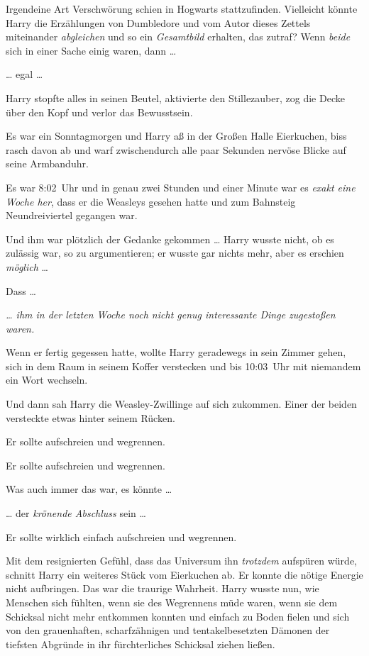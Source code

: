Irgendeine Art Verschwörung schien in Hogwarts stattzufinden. Vielleicht könnte Harry die Erzählungen von Dumbledore und vom Autor dieses Zettels miteinander \emph{abgleichen} und so ein \emph{Gesamtbild} erhalten, das zutraf? Wenn \emph{beide} sich in einer Sache einig waren, dann … 

… egal … 

Harry stopfte alles in seinen Beutel, aktivierte den Stillezauber, zog die Decke über den Kopf und verlor das Bewusstsein. 

\later 

Es war ein Sonntagmorgen und Harry aß in der Großen Halle Eierkuchen, biss rasch davon ab und warf zwischendurch alle paar Sekunden nervöse Blicke auf seine Armbanduhr. 

Es war 8:02~Uhr und in genau zwei Stunden und einer Minute war es \emph{exakt eine Woche her}, dass er die Weasleys gesehen hatte und zum Bahnsteig Neundreiviertel gegangen war. 

Und ihm war plötzlich der Gedanke gekommen … Harry wusste nicht, ob es zulässig war, so zu argumentieren; er wusste gar nichts mehr, aber es erschien \emph{möglich} … 

Dass … 

\emph{… ihm in der letzten Woche noch nicht genug interessante Dinge zugestoßen waren.} 

Wenn er fertig gegessen hatte, wollte Harry geradewegs in sein Zimmer gehen, sich in dem Raum in seinem Koffer verstecken und bis 10:03~Uhr mit niemandem ein Wort wechseln. 

Und dann sah Harry die Weasley-Zwillinge auf sich zukommen. Einer der beiden versteckte etwas hinter seinem Rücken. 

Er sollte aufschreien und wegrennen. 

Er sollte aufschreien und wegrennen. 

Was auch immer das war, es könnte … 

… der \emph{krönende Abschluss} sein … 

Er sollte wirklich einfach aufschreien und wegrennen. 

Mit dem resignierten Gefühl, dass das Universum ihn \emph{trotzdem} aufspüren würde, schnitt Harry ein weiteres Stück vom Eierkuchen ab. Er konnte die nötige Energie nicht aufbringen. Das war die traurige Wahrheit. Harry wusste nun, wie Menschen sich fühlten, wenn sie des Wegrennens müde waren, wenn sie dem Schicksal nicht mehr entkommen konnten und einfach zu Boden fielen und sich von den grauenhaften, scharfzähnigen und tentakelbesetzten Dämonen der tiefsten Abgründe in ihr fürchterliches Schicksal ziehen ließen. 


